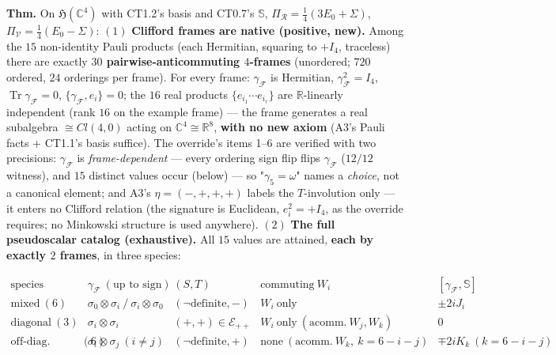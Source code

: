 \begin{theorem}\label{tag:FT-93}
\textbf{Thm.} On $\mathfrak H(\mathbb C^4)$ with CT1.2's basis and CT0.7's $\mathbb S$, $\Pi_{\mathcal R}=\tfrac14(3E_0+\Sigma)$, $\Pi_{\mathcal V}=\tfrac14(E_0-\Sigma)$: $(1)$ \textbf{Clifford frames are native (positive, new).} Among the $15$ non-identity Pauli products (each Hermitian, squaring to $+I_4$, traceless) there are exactly \textbf{$30$ pairwise-anticommuting $4$-frames} (unordered; $720$ ordered, $24$ orderings per frame). For every frame: $\gamma_{\mathcal F}$ is Hermitian, $\gamma_{\mathcal F}^2=I_4$, $\operatorname{Tr}\gamma_{\mathcal F}=0$, $\{\gamma_{\mathcal F},e_i\}=0$; the $16$ real products $\{e_{i_1}\cdots e_{i_r}\}$ are $\mathbb R$-linearly independent (rank $16$ on the example frame) — the frame generates a real subalgebra $\cong Cl(4,0)$ acting on $\mathbb C^4\cong\mathbb R^8$, \textbf{with no new axiom} (A3's Pauli facts + CT1.1's basis suffice). The override's items 1–6 are verified with two precisions: $\gamma_{\mathcal F}$ is \textit{frame-dependent} — every ordering sign flip flips $\gamma_{\mathcal F}$ ($12/12$ witness), and $15$ distinct values occur (below) — so "$\gamma_5=\omega$" names a \textit{choice}, not a canonical element; and A3's $\eta=(-,+,+,+)$ labels the $T$-involution only — it enters no Clifford relation (the signature is Euclidean, $e_i^2=+I_4$, as the override requires; no Minkowski structure is used anywhere). $(2)$ \textbf{The full pseudoscalar catalog (exhaustive).} All $15$ values are attained, \textbf{each by exactly $2$ frames}, in three species:

\[
\begin{array}{c|c|c|c|c}
\text{species} & \gamma_{\mathcal F}\ (\text{up to sign}) & (S,T) & \text{commuting}\ W_i & [\gamma_{\mathcal F},\mathbb S]\\
\hline
\text{mixed}\ (6) & \sigma_0\otimes\sigma_i\ /\ \sigma_i\otimes\sigma_0 & (\neg\text{definite},-) & W_i\ \text{only} & \pm2iJ_i\\
\text{diagonal}\ (3) & \sigma_i\otimes\sigma_i & (+,+)\in\mathcal E_{++} & W_i\ \text{only}\ (\text{acomm.}\ W_j,W_k) & 0\\
\text{off-diag. spatial}\ (6) & \sigma_i\otimes\sigma_j\ (i\ne j) & (\neg\text{definite},+) & \text{none}\ (\text{acomm.}\ W_k,\ k=6{-}i{-}j) & \mp2iK_k\ (k=6{-}i{-}j)
\end{array}
\]


\end{theorem}
